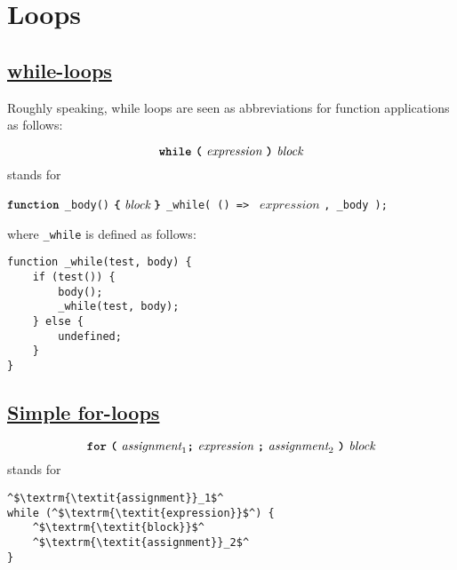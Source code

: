 \section*{Loops}

\subsection*{\href{https://source-academy.github.io/sicp/chapters/4.1.2.html\#ex_4.7}{while-loops}}

Roughly speaking, while loops are seen as abbreviations for function applications as follows:

\[
\textbf{\texttt{while}}\ \textbf{\texttt{(}}\  \textit{expression} \ \textbf{\texttt{)}} \
\textit{block}
\]
stands for

\begin{center}
  \begin{minipage}{90mm}
$\textbf{\texttt{function}}$ \lstinline{_body()} $\textbf{\texttt{\{}}\  \textit{block} \ \textbf{\texttt{\}}}$\newline
\lstinline{_while( () => } $\textit{expression}$ \lstinline{, _body );}
  \end{minipage}
\end{center}

where \lstinline{_while} is defined as follows:

\begin{lstlisting}
function _while(test, body) {
    if (test()) {
        body(); 
        _while(test, body); 
    } else { 
        undefined; 
    }
}
\end{lstlisting}

\subsection*{\href{https://source-academy.github.io/sicp/chapters/4.1.2.html\#ex_4.8}{Simple for-loops}}

\[\textbf{\texttt{for}}\ \textbf{\texttt{(}} \ 
                                          \textit{assignment}_1 \textbf{\texttt{;}} 
\ \textit{expression} \ \textbf{\texttt{;}} \ \textit{assignment}_2 \ \textbf{\texttt{)}} \ 
                                            \textit{block}
\]
stands for
\begin{center}
  \begin{minipage}{90mm}
\begin{lstlisting}
^$\textrm{\textit{assignment}}_1$^  
while (^$\textrm{\textit{expression}}$^) {
    ^$\textrm{\textit{block}}$^
    ^$\textrm{\textit{assignment}}_2$^
}
\end{lstlisting}
  \end{minipage}
\end{center}

